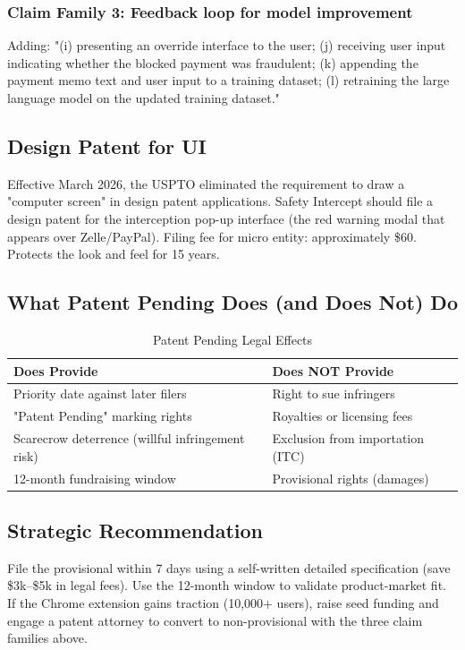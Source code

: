 \documentclass[12pt]{article}
\begin{document}
\subsubsection{Claim Family 3: Feedback loop for model improvement}
Adding: "(i) presenting an override interface to the user; (j) receiving user input indicating whether the blocked payment was fraudulent; (k) appending the payment memo text and user input to a training dataset; (l) retraining the large language model on the updated training dataset."

\subsection{Design Patent for UI}

Effective March 2026, the USPTO eliminated the requirement to draw a "computer screen" in design patent applications. Safety Intercept should file a design patent for the interception pop-up interface (the red warning modal that appears over Zelle/PayPal). Filing fee for micro entity: approximately \$60. Protects the look and feel for 15 years.

\subsection{What Patent Pending Does (and Does Not) Do}

\begin{table}[H]
\centering
\caption{Patent Pending Legal Effects}
\begin{tabular}{|l|l|}
\hline
\textbf{Does Provide} & \textbf{Does NOT Provide} \\
\hline
Priority date against later filers & Right to sue infringers \\
\hline
"Patent Pending" marking rights & Royalties or licensing fees \\
\hline
Scarecrow deterrence (willful infringement risk) & Exclusion from importation (ITC) \\
\hline
12-month fundraising window & Provisional rights (damages) \\
\hline
\end{tabular}
\end{table}

\subsection{Strategic Recommendation}
File the provisional within 7 days using a self-written detailed specification (save \$3k–\$5k in legal fees). Use the 12-month window to validate product-market fit. If the Chrome extension gains traction (10,000+ users), raise seed funding and engage a patent attorney to convert to non-provisional with the three claim families above.
\end{document}

